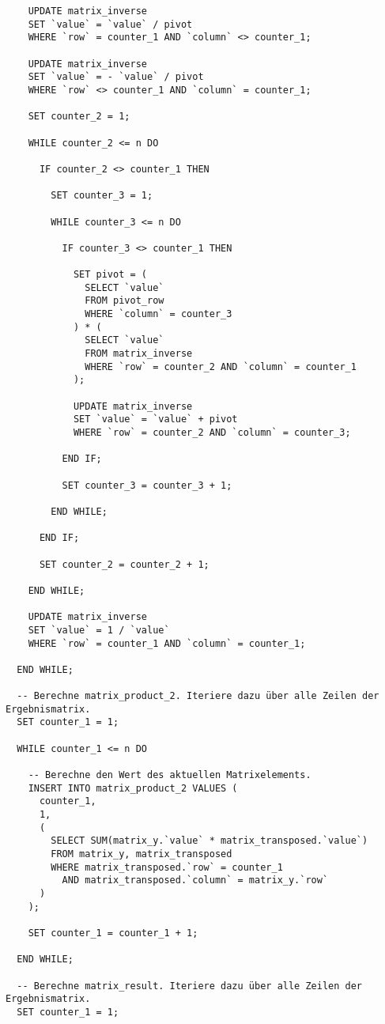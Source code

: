 \begin{verbatim}
    UPDATE matrix_inverse
    SET `value` = `value` / pivot
    WHERE `row` = counter_1 AND `column` <> counter_1;

    UPDATE matrix_inverse
    SET `value` = - `value` / pivot
    WHERE `row` <> counter_1 AND `column` = counter_1;

    SET counter_2 = 1;

    WHILE counter_2 <= n DO

      IF counter_2 <> counter_1 THEN

        SET counter_3 = 1;

        WHILE counter_3 <= n DO

          IF counter_3 <> counter_1 THEN

            SET pivot = (
              SELECT `value`
              FROM pivot_row
              WHERE `column` = counter_3
            ) * (
              SELECT `value`
              FROM matrix_inverse
              WHERE `row` = counter_2 AND `column` = counter_1
            );

            UPDATE matrix_inverse
            SET `value` = `value` + pivot
            WHERE `row` = counter_2 AND `column` = counter_3;

          END IF;

          SET counter_3 = counter_3 + 1;

        END WHILE;

      END IF;

      SET counter_2 = counter_2 + 1;

    END WHILE;

    UPDATE matrix_inverse
    SET `value` = 1 / `value`
    WHERE `row` = counter_1 AND `column` = counter_1;

  END WHILE;

  -- Berechne matrix_product_2. Iteriere dazu über alle Zeilen der Ergebnismatrix.
  SET counter_1 = 1;

  WHILE counter_1 <= n DO

    -- Berechne den Wert des aktuellen Matrixelements.
    INSERT INTO matrix_product_2 VALUES (
      counter_1,
      1,
      (
        SELECT SUM(matrix_y.`value` * matrix_transposed.`value`)
        FROM matrix_y, matrix_transposed
        WHERE matrix_transposed.`row` = counter_1
          AND matrix_transposed.`column` = matrix_y.`row`
      )
    );

    SET counter_1 = counter_1 + 1;

  END WHILE;

  -- Berechne matrix_result. Iteriere dazu über alle Zeilen der Ergebnismatrix.
  SET counter_1 = 1;


\end{verbatim}
